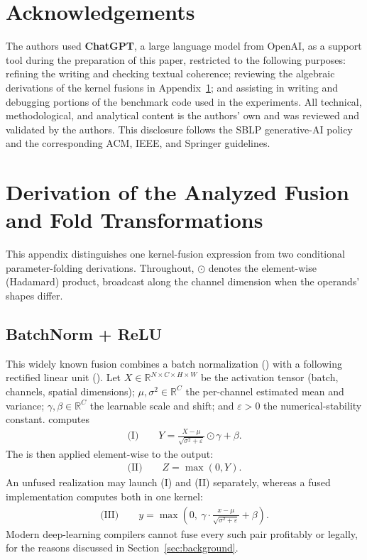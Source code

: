 \documentclass[sigconf]{acmart}
\DeclareRobustCommand{\tcode}[1]{\texttt{\seqsplit{#1}}}
\begin{document}
\section*{Acknowledgements}
The authors used \textbf{ChatGPT}, a large language model from OpenAI, as a support tool during the
preparation of this paper, restricted to the following purposes: refining the
writing and checking textual coherence; reviewing the algebraic derivations of
the kernel fusions in Appendix~\ref{app:fusions}; and assisting in writing and
debugging portions of the benchmark code used in the experiments. All technical,
methodological, and analytical content is the authors' own and was reviewed and
validated by the authors. This disclosure follows the SBLP generative-AI policy
and the corresponding ACM, IEEE, and Springer guidelines.


\appendix

\section{Derivation of the Analyzed Fusion and Fold Transformations}
\label{app:fusions}

This appendix distinguishes one kernel-fusion expression from two conditional parameter-folding derivations. Throughout, $\odot$ denotes the element-wise (Hadamard) product, broadcast along the channel dimension when the operands' shapes differ.

\subsection*{BatchNorm + ReLU}
This widely known fusion combines a batch normalization (\tcode{BatchNorm}) with a following rectified linear unit (\tcode{ReLU}). Let $X\in\mathbb{R}^{N\times C\times H\times W}$ be the activation tensor (batch, channels, spatial dimensions); $\mu,\sigma^2\in\mathbb{R}^{C}$ the per-channel estimated mean and variance; $\gamma,\beta\in\mathbb{R}^{C}$ the learnable scale and shift; and $\varepsilon>0$ the numerical-stability constant. \tcode{BatchNorm} computes
\begin{align}
\text{(I)}\qquad Y = \frac{X-\mu}{\sqrt{\sigma^2+\varepsilon}}\odot\gamma + \beta .
\end{align}
The \tcode{ReLU} is then applied element-wise to the output:
\begin{align}
\text{(II)}\qquad Z = \max(0, Y).
\end{align}
An unfused realization may launch (I) and (II) separately, whereas a fused implementation computes both in one kernel:
\begin{align}
\text{(III)}\qquad y = \max\!\left(0,\ \gamma\cdot\frac{x-\mu}{\sqrt{\sigma^2+\varepsilon}}+\beta\right).
\end{align}
Modern deep-learning compilers cannot fuse every such pair profitably or legally, for the reasons discussed in Section~\ref{sec:background}.
\end{document}
